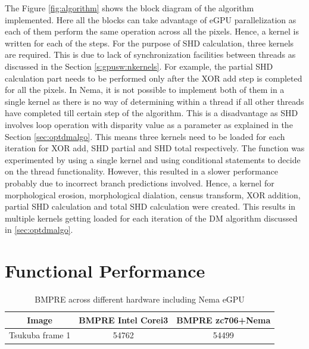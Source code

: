 The Figure \ref{fig:algorithm} shows the block diagram of the algorithm implemented. Here all the blocks can take advantage of eGPU parallelization as each of them perform the same operation across all the pixels. Hence, a kernel is written for each of the steps. For the purpose of SHD calculation, three kernels are required. This is due to lack of synchronization facilities between threads as discussed in the Section \ref{s:gpusw:nkernels}. For example, the partial SHD calculation part needs to be performed only after the XOR add step is completed for all the pixels. In Nema, it is not possible to implement both of them in a single kernel as there is no way of determining within a thread if all other threads have completed till certain step of the algorithm. This is a disadvantage as SHD involves loop operation with disparity value as a parameter as explained in the Section \ref{sec:optdmalgo}. This means three kernels need to be loaded for each iteration for XOR add, SHD partial and SHD total respectively. The function was experimented by using a single kernel and using conditional statements to decide on the thread functionality. However, this resulted in a slower performance probably due to incorrect branch predictions involved. Hence, a kernel for morphological erosion, morphological dialation, census transform, XOR addition, partial SHD calculation and total SHD calculation were created. This results in multiple kernels getting loaded for each iteration of the DM algorithm discussed in \ref{sec:optdmalgo}.
%

\section{Functional Performance}
\label{sec:fperformance}

\begin{table}[!htbp]
\centering
\begin{tabular}{@{}|c|c|c|@{}}
\toprule
\textbf{Image}  & \textbf{BMPRE Intel Corei3} & \textbf{BMPRE zc706+Nema} \\ \midrule
Tsukuba frame 1 & 54762                       & 54499                     \\ \bottomrule
\end{tabular}
\caption{BMPRE across different hardware including Nema eGPU}
\label{tab:bmprenema}
\end{table}

